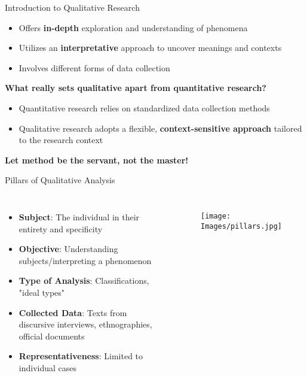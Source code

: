 \documentclass[10pt, aspectratio=169]{beamer}
\begin{document}

\begin{frame}{Introduction to Qualitative Research}
\begin{itemize}
\item Offers \textbf{in-depth} exploration and understanding of phenomena\vspace{0.3cm}
\item Utilizes an \textbf{interpretative} approach to uncover meanings and contexts\vspace{0.3cm}
\item Involves different forms of data collection\vspace{0.3cm}
\end{itemize}
\vspace{0.3cm}
\textbf{What really sets qualitative apart from quantitative research?}
\begin{itemize}
\item Quantitative research relies on standardized data collection methods\vspace{0.3cm}
\item Qualitative research adopts a flexible, \textbf{context-sensitive approach} tailored to the research context\vspace{0.3cm}
\end{itemize}
\centering
\textbf{Let method be the servant, not the master!}
\end{frame}

\begin{frame}{Pillars of Qualitative Analysis}
\begin{columns}
\begin{itemize}
    \item \textbf{Subject}: The individual in their entirety and specificity\vspace{0.3cm}
    \item \textbf{Objective}: Understanding subjects/interpreting a phenomenon\vspace{0.3cm}
    \item \textbf{Type of Analysis}: Classifications, "ideal types"\vspace{0.3cm}
    \item \textbf{Collected Data}: Texts from discursive interviews, ethnographies, official documents\vspace{0.3cm}
    \item \textbf{Representativeness}: Limited to individual cases\vspace{0.3cm}
\end{itemize}
\begin{figure}
    \centering
    \texttt{[image: Images/pillars.jpg]}
    \label{fig:pillars}
\end{figure}
\end{columns}
\end{frame}
\end{document}
